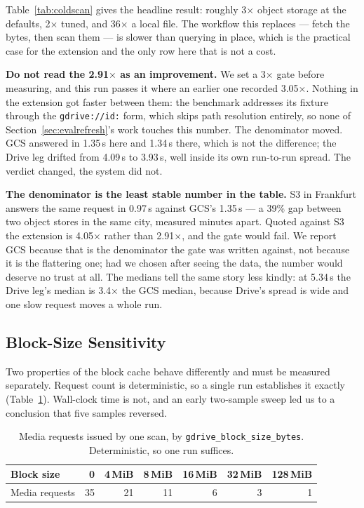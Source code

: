 \documentclass[sigconf, nonacm]{acmart}
\begin{document}
Table~\ref{tab:coldscan} gives the headline result: roughly 3$\times$ object
storage at the defaults, 2$\times$ tuned, and 36$\times$ a local file. The
workflow this replaces --- fetch the bytes, then scan them --- is slower than
querying in place, which is the practical case for the extension and the only
row here that is not a cost.

\textbf{Do not read the 2.91$\times$ as an improvement.} We set a 3$\times$ gate
before measuring, and this run passes it where an earlier one recorded
3.05$\times$. Nothing in the extension got faster between them: the benchmark
addresses its fixture through the \texttt{gdrive://id:} form, which skips path
resolution entirely, so none of Section~\ref{sec:evalrefresh}'s work touches
this number. The denominator moved. GCS answered in 1.35\,s here and 1.34\,s
there, which is not the difference; the Drive leg drifted from 4.09\,s to
3.93\,s, well inside its own run-to-run spread. The verdict changed, the system
did not.

\textbf{The denominator is the least stable number in the table.} S3 in
Frankfurt answers the same request in 0.97\,s against GCS's 1.35\,s --- a 39\%
gap between two object stores in the same city, measured minutes apart. Quoted
against S3 the extension is 4.05$\times$ rather than 2.91$\times$, and the gate
would fail. We report GCS because that is the denominator the gate was written
against, not because it is the flattering one; had we chosen after seeing the
data, the number would deserve no trust at all. The medians tell the same
story less kindly: at 5.34\,s the Drive leg's median is 3.4$\times$ the GCS
median, because Drive's spread is wide and one slow request moves a whole run.

\subsection{Block-Size Sensitivity}

Two properties of the block cache behave differently and must be measured
separately. Request count is deterministic, so a single run establishes it
exactly (Table~\ref{tab:blockreqs}). Wall-clock time is not, and an early
two-sample sweep led us to a conclusion that five samples reversed.

\begin{table}[t]
\caption{Media requests issued by one scan, by
\texttt{gdrive\_block\_size\_bytes}. Deterministic, so one run suffices.}
\label{tab:blockreqs}
\footnotesize
\setlength{\tabcolsep}{4pt}
\begin{tabular}{lrrrrrr}
\toprule
Block size & 0 & 4\,MiB & 8\,MiB & 16\,MiB & 32\,MiB & 128\,MiB \\
\midrule
Media requests & 35 & 21 & 11 & 6 & 3 & 1 \\
\bottomrule
\end{tabular}
\end{table}
\end{document}
